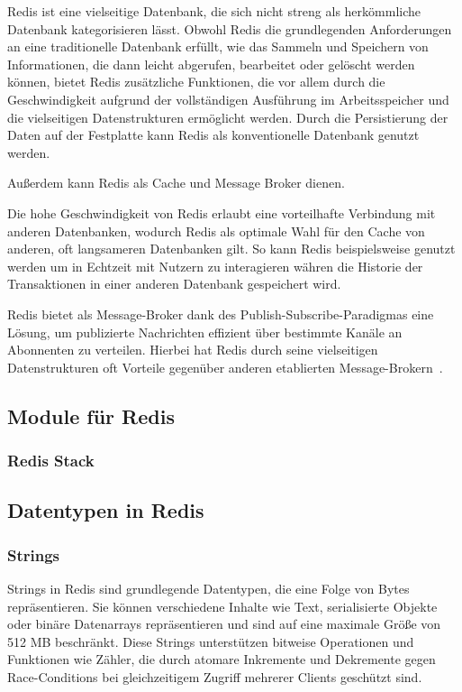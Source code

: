 
Redis ist eine vielseitige Datenbank, die sich nicht streng als herkömmliche Datenbank kategorisieren lässt. Obwohl Redis die grundlegenden Anforderungen an eine traditionelle Datenbank erfüllt, wie das Sammeln und Speichern von Informationen, die dann leicht abgerufen, bearbeitet oder gelöscht werden können, bietet Redis zusätzliche Funktionen, die vor allem durch die Geschwindigkeit aufgrund der vollständigen Ausführung im Arbeitsspeicher und die vielseitigen Datenstrukturen ermöglicht werden.
Durch die Persistierung der Daten auf der Festplatte kann Redis als konventionelle Datenbank genutzt werden.

Außerdem kann Redis als Cache und Message Broker dienen.

Die hohe Geschwindigkeit von Redis erlaubt eine vorteilhafte Verbindung mit anderen Datenbanken, wodurch Redis als optimale Wahl für den Cache von anderen, oft langsameren Datenbanken gilt. So kann Redis beispielsweise genutzt werden um in Echtzeit mit Nutzern zu interagieren währen die Historie der Transaktionen in einer anderen Datenbank gespeichert wird.

Redis bietet als Message-Broker dank des Publish-Subscribe-Paradigmas eine Lösung, um publizierte Nachrichten effizient über bestimmte Kanäle an Abonnenten zu verteilen. Hierbei hat Redis durch seine vielseitigen Datenstrukturen oft Vorteile gegenüber anderen etablierten Message-Brokern~\cite{joshi_you_nodate}.

\subsection{Module für Redis}
\subsubsection{Redis Stack}


\subsection{Datentypen in Redis}
\subsubsection{Strings}
Strings in Redis sind grundlegende Datentypen, die eine Folge von Bytes repräsentieren.
Sie können verschiedene Inhalte wie Text, serialisierte Objekte oder binäre Datenarrays repräsentieren und sind auf eine maximale Größe von 512 MB beschränkt.
Diese Strings unterstützen bitweise Operationen und Funktionen wie Zähler, die durch atomare Inkremente und Dekremente gegen Race-Conditions bei gleichzeitigem Zugriff mehrerer Clients geschützt sind.

